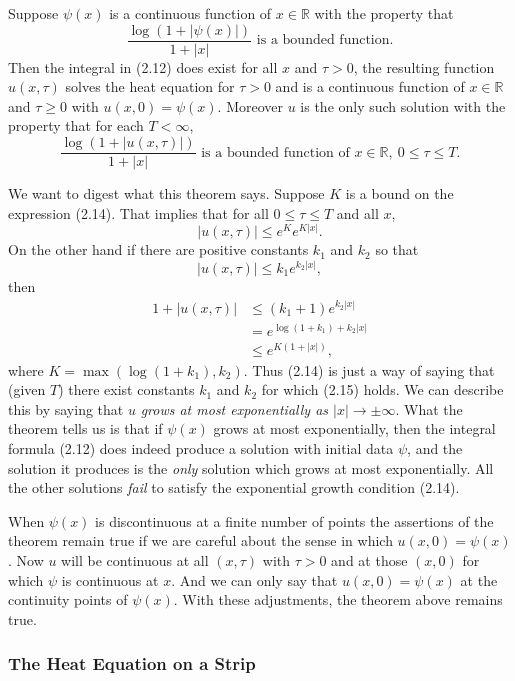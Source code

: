 \begin{theorem}
Suppose \(\psi(x)\) is a continuous function of \(x \in \mathbb{R}\) with the property that
\[
\frac{\log(1 + |\psi(x)|)}{1 + |x|} \text{ is a bounded function.} \tag{2.13}
\]
Then the integral in (2.12) does exist for all \(x\) and \(\tau > 0\), the resulting function \(u(x,\tau)\) solves the heat equation for \(\tau > 0\) and is a continuous function of \(x \in \mathbb{R}\) and \(\tau \geq 0\) with \(u(x,0) = \psi(x)\). Moreover \(u\) is the only such solution with the property that for each \(T < \infty\),
\[
\frac{\log(1 + |u(x,\tau)|)}{1 + |x|} \text{ is a bounded function of } x \in \mathbb{R}, \ 0 \leq \tau \leq T. \tag{2.14}
\]
\end{theorem}

We want to digest what this theorem says. Suppose \(K\) is a bound on the expression (2.14). That implies that for all \(0 \leq \tau \leq T\) and all \(x\),
\[
|u(x,\tau)| \leq e^K e^{K |x|}.
\]
On the other hand if there are positive constants \(k_1\) and \(k_2\) so that
\[
|u(x,\tau)| \leq k_1 e^{k_2 |x|}, \tag{2.15}
\]
then
\begin{align*}
1 + |u(x,\tau)| &\leq (k_1 + 1) e^{k_2 |x|} \\
&= e^{\log(1+k_1) + k_2 |x|} \\
&\leq e^{K (1 + |x|)},
\end{align*}
where \(K = \max(\log(1+k_1), k_2)\). Thus (2.14) is just a way of saying that (given \(T\)) there exist constants \(k_1\) and \(k_2\) for which (2.15) holds. We can describe this by saying that \(u\) \textit{grows at most exponentially as \(|x| \to \pm \infty\)}. What the theorem tells us is that if \(\psi(x)\) grows at most exponentially, then the integral formula (2.12) does indeed produce a solution with initial data \(\psi\), and the solution it produces is the \textit{only} solution which grows at most exponentially. All the other solutions \textit{fail} to satisfy the exponential growth condition (2.14).

When \(\psi(x)\) is discontinuous at a finite number of points the assertions of the theorem remain true if we are careful about the sense in which \(u(x,0) = \psi(x)\). Now \(u\) will be continuous at all \((x,\tau)\) with \(\tau > 0\) and at those \((x,0)\) for which \(\psi\) is continuous at \(x\). And we can only say that \(u(x,0) = \psi(x)\) at the continuity points of \(\psi(x)\). With these adjustments, the theorem above remains true.

\subsubsection{The Heat Equation on a Strip}

